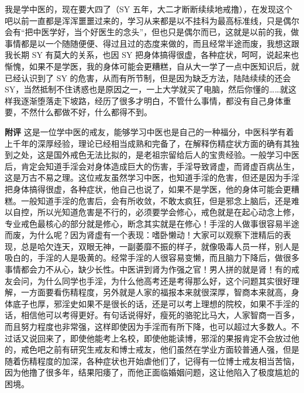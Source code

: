 \begin{case}
    我是学中医的，现在要大四了（SY 五年，大二才断断续续地戒撸），在发现这个吧以前一直都是浑浑噩噩过来的，学习从来都是以不挂科为最高标准线，只是偶尔会有“把中医学好，当个好医生的念头”，但也只是偶尔而已，这就是以前的我，做事情都是以一个随随便便、得过且过的态度来做的，而且经常半途而废，我想这跟我长期 SY 有莫大的关系，也因 SY 把身体搞得很虚，各种症状，呵呵，说起来也惭愧，如果不是学医，我的身体可能会更糟糕，自从大一学了一点中医知识后，就已经认识到了 SY 的危害，从而有所节制，但是因为缺乏方法，陆陆续续的还会 SY，当然抵制不住诱惑也是原因之一，一上大学就买了电脑，然后你懂的……就这样我逐渐堕落走下坡路，经历了很多才明白，不管什么事情，都没有自己身体重要，不然什么都做不好，什么都得不到。

    \textbf{附评} 这是一位学中医的戒友，能够学习中医也是自己的一种福分，中医科学有着上千年的深厚经验，理论已经相当成熟和完备了，在解释伤精症状方面的确有其独到之处，这是国外戒色无法比拟的，是老祖宗留给后人的宝贵经验。一般学习中医后，肯定会知道手淫会对身体造成巨大的伤害，手淫导致肾虚，而肾虚百病丛生，这是万古不易之理。这位戒友虽然学习中医，也知道手淫的危害，但还是因为手淫把身体搞得很虚，各种症状，他自己也说了，如果不是学医，他的身体可能会更糟糕。一般知道手淫的危害后，会有所收敛，不敢太疯狂，但是邪念上脑后，还是难以自控，所以光知道危害是不行的，必须要学会修心，戒色就是在起心动念上修，专业戒色最核心的部分就是修心，断念其实就是在修心！手淫的人做事很容易半途而废，为什么呢？因为肾虚有一个表现：嗜卧懒动！大家可以观察下泄精后的表现，总是哈欠连天，双眼无神，一副萎靡不振的样子，就像吸毒人员一样，别人是吸白的，手淫的人是吸黄的。经常手淫的人很容易变懒，而且脑力下降后，做很多事情都会力不从心，缺少长性。中医讲到肾为作强之官！男人拼的就是肾！有的戒友会问，为什么同学也手淫，为什么他高考还是考得那么好，这个问题其实很好理解，一方面要看伤精程度，另外就是人家的福报本来就很深厚，智商本来就高，身体底子也厚，邪淫史如果不是很长的话，还是可以考上理想的院校，如果不手淫的话，相信他可以考得更好。有句话说得好，瘦死的骆驼比马大，人家智商一百多，而且努力程度也非常强，这样即使因为手淫而有所下降，也可以超过大多数人。不过话又说回来了，即使他能考上名校，即使他能读博，邪淫的果报肯定不会放过他的，戒色吧之前有研究生戒友和博士戒友，他们虽然在学业方面较普通人强，但是随着伤精程度的加深，各种症状也开始虐他们了，记得有一位博士戒友相当苦恼，因为他撸了很多年，结果阳痿了，而他正面临婚姻问题，这让他陷入了极度尴尬的困境。


\end{case}
